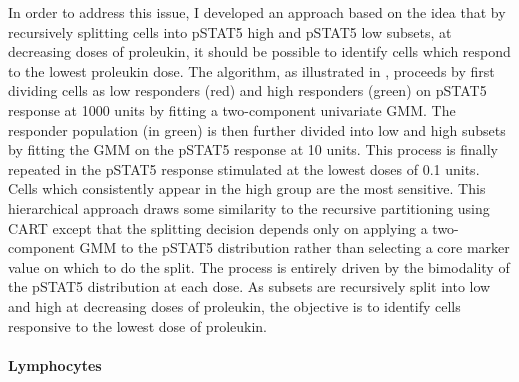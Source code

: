 In order to address this issue, I developed an approach based on the idea that by recursively splitting cells
into pSTAT5 high and pSTAT5 low subsets, at decreasing doses of proleukin,
it should be possible to identify cells which respond to the lowest proleukin dose.
The algorithm, as illustrated in , proceeds by first dividing cells as low responders (red) and high responders (green)
on pSTAT5 response at 1000 units by fitting a two-component univariate \gls{GMM}.
The responder population (in green) is then further divided into low and high subsets by fitting the \gls{GMM} on the pSTAT5 response at 10 units.
This process is finally repeated in the pSTAT5 response stimulated at the lowest doses of 0.1 units.
Cells which consistently appear in the high group are the most sensitive.
This hierarchical approach draws some similarity to the recursive partitioning using \gls{CART} except that the splitting decision depends only
on applying a two-component \gls{GMM} to the pSTAT5 distribution rather than selecting a core marker value on which to do the split.
The process is entirely driven by the bimodality of the pSTAT5 distribution at each dose.
As subsets are recursively split into low and high at decreasing doses of proleukin, the objective is to identify cells responsive to the lowest dose of proleukin.

\paragraph{Lymphocytes}

